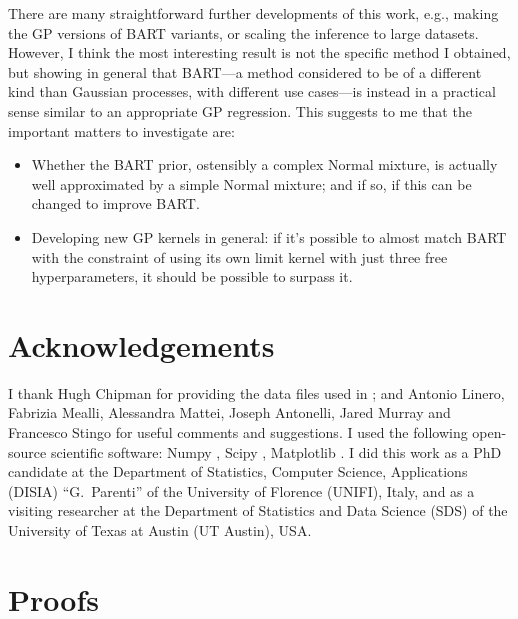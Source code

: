 \documentclass[a4paper]{article}
\theoremstyle{definition}
\begin{document}
    There are many straightforward further developments of this work, e.g., making the GP versions of BART variants, or scaling the inference to large datasets. However, I think the most interesting result is not the specific method I obtained, but showing in general that BART---a method considered to be of a different kind than Gaussian processes, with different use cases---is instead in a practical sense similar to an appropriate GP regression. This suggests to me that the important matters to investigate are:
    \begin{itemize}
        
        \item Whether the BART prior, ostensibly a complex Normal mixture, is actually well approximated by a simple Normal mixture; and if so, if this can be changed to improve BART.
        
        \item Developing new GP kernels in general: if it's possible to almost match BART with the constraint of using its own limit kernel with just three free hyperparameters, it should be possible to surpass it.

    \end{itemize}

    \section*{Acknowledgements}
    
    I thank Hugh Chipman for providing the data files used in \textcite{chipman2010}; and Antonio Linero, Fabrizia Mealli, Alessandra Mattei, Joseph Antonelli, Jared Murray and Francesco Stingo for useful comments and suggestions. I used the following open-source scientific software: Numpy \autocite{harris2020}, Scipy \autocite{scipy}, Matplotlib \autocite{matplotlib}. I did this work as a PhD candidate at the Department of Statistics, Computer Science, Applications (DISIA) ``G.\ Parenti'' of the University of Florence (UNIFI), Italy, and as a visiting researcher at the Department of Statistics and Data Science (SDS) of the University of Texas at Austin (UT Austin), USA.

    \printbibliography[heading=bibintoc]

    \clearpage
    
    \appendix
    
    \section{Proofs}
\end{document}
